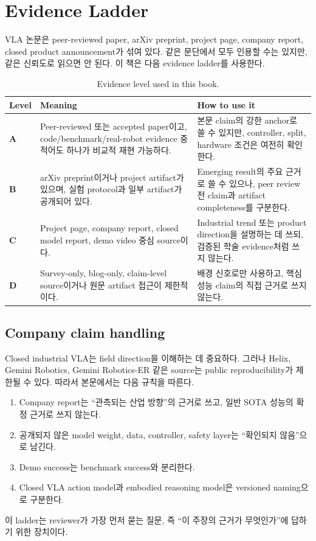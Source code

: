 \chapter{Evidence Ladder}
\label{app:evidence_ladder}

VLA 논문은 peer-reviewed paper, arXiv preprint, project page, company report, closed product announcement가 섞여 있다. 같은 문단에서 모두 인용할 수는 있지만, 같은 신뢰도로 읽으면 안 된다. 이 책은 다음 evidence ladder를 사용한다.

\begin{table}[h]
  \centering
  \caption{Evidence level used in this book.}
  \label{tab:evidence_ladder}
  \begin{tabularx}{\textwidth}{>{\bfseries}p{16mm}p{44mm}X}
    \toprule
    Level & Meaning & How to use it \\
    \midrule
    A & Peer-reviewed 또는 accepted paper이고, code/benchmark/real-robot evidence 중 적어도 하나가 비교적 재현 가능하다. & 본문 claim의 강한 anchor로 쓸 수 있지만, controller, split, hardware 조건은 여전히 확인한다. \\
    B & arXiv preprint이거나 project artifact가 있으며, 실험 protocol과 일부 artifact가 공개되어 있다. & Emerging result의 주요 근거로 쓸 수 있으나, peer review 전 claim과 artifact completeness를 구분한다. \\
    C & Project page, company report, closed model report, demo video 중심 source이다. & Industrial trend 또는 product direction을 설명하는 데 쓰되, 검증된 학술 evidence처럼 쓰지 않는다. \\
    D & Survey-only, blog-only, claim-level source이거나 원문 artifact 접근이 제한적이다. & 배경 신호로만 사용하고, 핵심 성능 claim의 직접 근거로 쓰지 않는다. \\
    \bottomrule
  \end{tabularx}
\end{table}

\section*{Company claim handling}

Closed industrial VLA는 field direction을 이해하는 데 중요하다. 그러나 Helix, Gemini Robotics, Gemini Robotics-ER 같은 source는 public reproducibility가 제한될 수 있다. 따라서 본문에서는 다음 규칙을 따른다.

\begin{enumerate}
  \item Company report는 ``관측되는 산업 방향''의 근거로 쓰고, 일반 SOTA 성능의 확정 근거로 쓰지 않는다.
  \item 공개되지 않은 model weight, data, controller, safety layer는 ``확인되지 않음''으로 남긴다.
  \item Demo success는 benchmark success와 분리한다.
  \item Closed VLA action model과 embodied reasoning model은 versioned naming으로 구분한다.
\end{enumerate}

이 ladder는 reviewer가 가장 먼저 묻는 질문, 즉 ``이 주장의 근거가 무엇인가''에 답하기 위한 장치이다.
